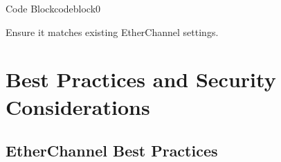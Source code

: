 \documentclass[a4paper]{article}
\begin{document}
\begin{enumerate}
\begin{itemize}
\begin{ocg}{Code Block}{codeblock}{0}
			            \begin{tcolorbox}
				            Ensure it matches existing EtherChannel settings.
			            \end{tcolorbox}



			            \vspace{0.5cm}
		            \end{ocg}
	      \end{itemize}
\end{enumerate}


\section{Best Practices and Security Considerations}
\subsection{EtherChannel Best Practices}
\end{document}
